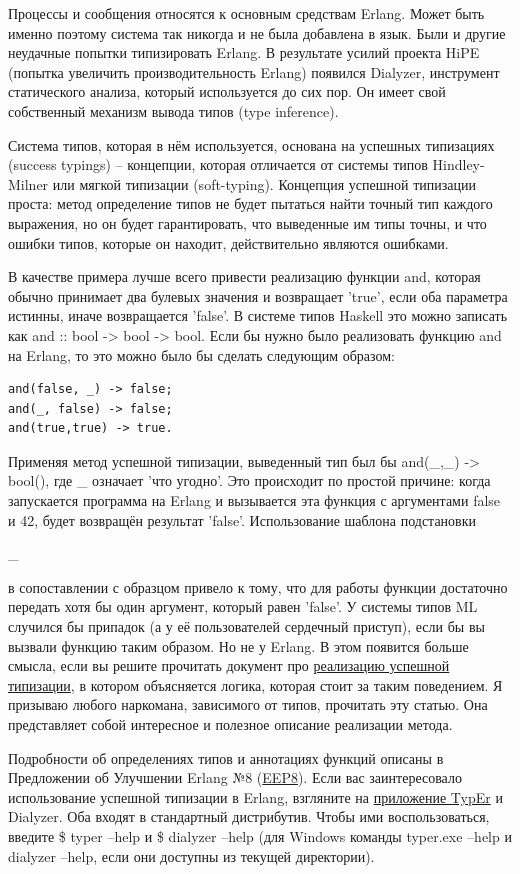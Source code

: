 \documentclass[a4paper,12pt]{report}
\newcommand{\ops}{\colorbox{lgreen}}
\begin{document}
Процессы и сообщения относятся к основным средствам Erlang. Может быть именно поэтому система так никогда и не была добавлена в язык. Были и другие неудачные попытки типизировать Erlang. В результате усилий проекта HiPE (попытка увеличить производительность Erlang) появился Dialyzer, инструмент статического анализа, который используется до сих пор. Он имеет свой собственный механизм вывода типов (type inference).

Система типов, которая в нём используется, основана на успешных типизациях (success typings) \--- концепции, которая отличается от системы типов Hindley\--Milner или мягкой типизации (soft\--typing). Концепция успешной типизации проста: метод определение типов не будет пытаться найти точный тип каждого выражения, но он будет гарантировать, что выведенные им типы точны, и что ошибки типов, которые он находит, действительно являются ошибками.

В качестве примера лучше всего привести реализацию функции \ops{and}, которая обычно принимает два булевых значения и возвращает 'true', если оба параметра истинны, иначе возвращается 'false'. В системе типов Haskell это можно записать как \ops{and :: bool -> bool -> bool}. Если бы нужно было реализовать функцию \ops{and} на Erlang, то это можно было бы сделать следующим образом:
\begin{lstlisting}[style=erlang]
and(false, _) -> false;
and(_, false) -> false;
and(true,true) -> true.
\end{lstlisting}

Применяя метод успешной типизации, выведенный тип был бы \ops{and(\_,\_) -> bool()}, где \_ означает 'что угодно'. Это происходит по простой причине: когда запускается программа на Erlang и вызывается эта функция с аргументами \ops{false} и \ops{42}, будет возвращён результат 'false'. Использование шаблона подстановки \ops{\strut\_} в сопоставлении с образцом привело к тому, что для работы функции достаточно передать хотя бы один аргумент, который равен 'false'. У системы типов ML случился бы припадок (а у её пользователей сердечный приступ), если бы вы вызвали функцию таким образом. Но не у Erlang. В этом появится больше смысла, если вы решите прочитать документ про \href{http://www.it.uu.se/research/group/hipe/papers/succ\_types.pdf}{реализацию успешной типизации}, в котором объясняется логика, которая стоит за таким поведением. Я призываю любого наркомана, зависимого от типов, прочитать эту статью. Она представляет собой интересное и полезное описание реализации метода.

Подробности об определениях типов и аннотациях функций описаны в Предложении об Улучшении Erlang №8 (\href{http://www.erlang.org/eeps/eep-0008.html}{EEP8}). Если вас заинтересовало использование успешной типизации в Erlang, взгляните на \href{http://user.it.uu.se/~tobiasl/publications/typer.pdf}{приложение TypEr} и Dialyzer. Оба входят в стандартный дистрибутив. Чтобы ими воспользоваться, введите \ops{\$ typer --help} и \ops{\$ dialyzer --help} (для Windows команды \ops{typer.exe --help} и \ops{dialyzer --help}, если они доступны из текущей директории).
\end{document}
